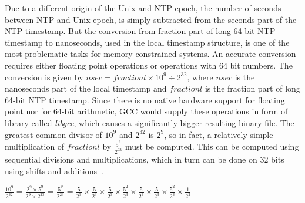Due to a different origin of the Unix and NTP epoch,
the number of seconds between NTP and Unix epoch,
is simply subtracted from the seconds part of the NTP timestamp.
But the conversion from fraction part of long 64-bit NTP timestamp to nanoseconds,
used in the local timestamp structure,
is one of the most problematic tasks for memory constrained systems.
An accurate conversion requires either floating point operations or operations with 64 bit numbers.
The conversion is given by
$nsec = fractionl \times 10^9 \div 2^{32}$, where $nsec$ is the nanoseconds part of the local timestamp
and $fractionl$ is the fraction part of long 64-bit NTP timestamp.
Since there is no native hardware support for floating point nor for 64-bit arithmetic,
GCC would supply these operations in form of library called {\it{libgcc}},
which causes a significantly bigger resulting binary file.
The greatest common divisor of $10^9$ and $2^{32}$ is $2^9$,
so in fact, a relatively simple multiplication of $fractionl$ by $\frac{5^9}{2^{23}}$ must be computed.
This can be computed using sequential divisions and multiplications,
which in turn can be done on 32 bits using shifts and additions~\cite{c99}.

$\frac{10^9}{2^{32}} = \frac{2^9 \times 5^9}{2^9 \times 2^{23}} =
\frac{5^9}{2^{23}} = \frac{5}{2^3} \times \frac{5}{2^3} \times \frac{5}{2^3} \times \frac{5^2}{2^3}
\times \frac{5}{2^3}  \times \frac{5}{2^3} \times \frac{5^2}{2^3} \times \frac{1}{2^2}$
